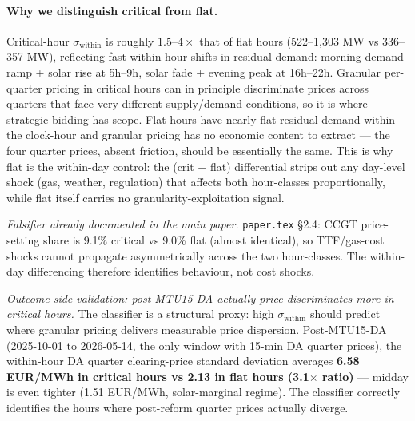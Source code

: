 \documentclass[11pt,a4paper]{article}
\newcommand{\code}[1]{\nolinkurl{#1}}
\begin{document}
\paragraph{Why we distinguish critical from flat.}
Critical-hour $\sigma_{\text{within}}$ is roughly $1.5$--$4\times$ that of flat hours (522--1,303 MW vs 336--357 MW), reflecting fast within-hour shifts in residual demand: morning demand ramp + solar rise at 5h--9h, solar fade + evening peak at 16h--22h. Granular per-quarter pricing in critical hours can in principle discriminate prices across quarters that face very different supply/demand conditions, so it is where strategic bidding has scope. Flat hours have nearly-flat residual demand within the clock-hour and granular pricing has no economic content to extract --- the four quarter prices, absent friction, should be essentially the same. This is why flat is the within-day control: the (crit $-$ flat) differential strips out any day-level shock (gas, weather, regulation) that affects both hour-classes proportionally, while flat itself carries no granularity-exploitation signal.

\emph{Falsifier already documented in the main paper.} \code{paper.tex} \S2.4: CCGT price-setting share is 9.1\% critical vs 9.0\% flat (almost identical), so TTF/gas-cost shocks cannot propagate asymmetrically across the two hour-classes. The within-day differencing therefore identifies behaviour, not cost shocks.

\emph{Outcome-side validation: post-MTU15-DA actually price-discriminates more in critical hours.} The classifier is a structural proxy: high $\sigma_{\text{within}}$ should predict where granular pricing delivers measurable price dispersion. Post-MTU15-DA (2025-10-01 to 2026-05-14, the only window with 15-min DA quarter prices), the within-hour DA quarter clearing-price standard deviation averages \textbf{6.58 EUR/MWh in critical hours vs 2.13 in flat hours (3.1$\times$ ratio)} --- midday is even tighter (1.51 EUR/MWh, solar-marginal regime). The classifier correctly identifies the hours where post-reform quarter prices actually diverge.
\end{document}
